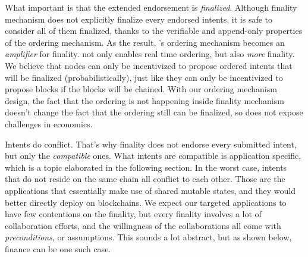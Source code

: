 What important is that the extended endorsement is \emph{finalized}.
Although finality mechanism does not explicitly finalize every endorsed intents, it is safe to consider all of them finalized, thanks to the verifiable and append-only properties of the ordering mechanism.
As the result, \sys's ordering mechanism becomes an \emph{amplifier} for finality.
\sys not only enables real time ordering, but also \emph{more} finality.
We believe that nodes can only be incentivized to propose ordered intents that will be finalized (probabilistically), just like they can only be incentivized to propose blocks if the blocks will be chained.
With our ordering mechanism design, the fact that the ordering is not happening inside finality mechanism doesn't change the fact that the ordering still can be finalized, so \sys does not expose challenges in economics.


Intents do conflict.
That's why finality does not endorse every submitted intent, but only the \emph{compatible} ones.
What intents are compatible is application specific, which is a topic elaborated in the following section.
In the worst case, intents that do not reside on the same chain all conflict to each other.
Those are the applications that essentially make use of shared mutable states, and they would better directly deploy on blockchains.
We expect our targeted applications to have few contentions on the finality, but every finality involves a lot of collaboration efforts, and the willingness of the collaborations all come with \emph{preconditions}, or assumptions.
This sounds a lot abstract, but as shown below, finance can be one such case.

